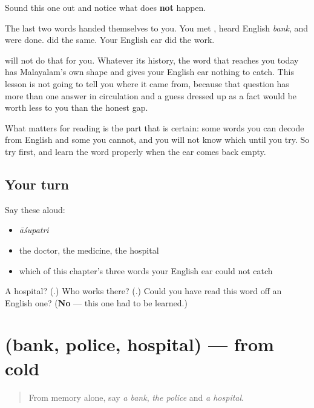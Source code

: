 \begin{culture}
Sound this one out and notice what does \textbf{not} happen.

The last two words handed themselves to you. You met \textbf{}, heard English \emph{bank}, and were done. \textbf{} did the same. Your English ear did the work.

\textbf{} will not do that for you. Whatever its history, the word that reaches you today has Malayalam's own shape and gives your English ear nothing to catch. This lesson is not going to tell you where it came from, because that question has more than one answer in circulation and a guess dressed up as a fact would be worth less to you than the honest gap.

What matters for reading is the part that is certain: some words you can decode from English and some you cannot, and you will not know which until you try. So try first, and learn the word properly when the ear comes back empty.
\end{culture}

\subsection*{Your turn}
Say these aloud:

\begin{itemize}
\raggedright
  \item \emph{āśupatri}
  \item the doctor, the medicine, the hospital
  \item which of this chapter's three words your English ear could not catch
\end{itemize}

\begin{tcolorbox}[breakable,colback=teal!4,colframe=teal!35!black,title={Before you move on}]
A hospital? (\textbf{}.) Who works there? (\textbf{}.) Could you have read this word off an English one? (\textbf{No} — this one had to be learned.)
\end{tcolorbox}
\section[(bank, police, hospital)]{(bank, police, hospital) — from cold}

\label{lesson:ML-R112-places-recall}



\begin{quote}
From memory alone, say \emph{a bank}, \emph{the police} and \emph{a hospital}.
\end{quote}

